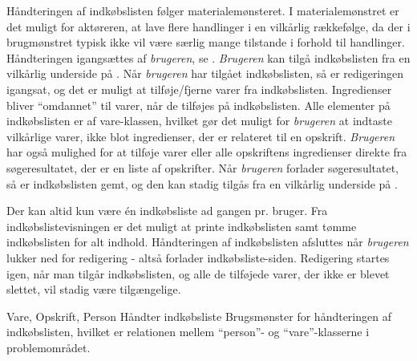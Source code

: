 {Håndteringen af indkøbslisten følger materialemønsteret\cite[p.~128]{ooad}. I materialemønstret er det muligt for aktøreren, at lave flere handlinger i en vilkårlig rækkefølge, da der i brugmønstret typisk ikke vil være særlig mange tilstande i forhold til handlinger. Håndteringen igangsættes af \textit{brugeren}, se . \textit{Brugeren} kan tilgå indkøbslisten fra en vilkårlig underside på \Foodl. Når \textit{brugeren} har tilgået indkøbslisten, så er redigeringen igangsat, og det er muligt at tilføje/fjerne varer fra indkøbslisten. Ingredienser bliver ``omdannet'' til varer, når de tilføjes på indkøbslisten. Alle elementer på indkøbslisten er af vare-klassen, hvilket gør det muligt for \textit{brugeren} at indtaste vilkårlige varer, ikke blot ingredienser, der er relateret til \fx en opskrift. \textit{Brugeren} har også mulighed for at tilføje varer eller alle opskriftens ingredienser direkte fra søgeresultatet, der er en liste af opskrifter. Når \textit{brugeren} forlader søgeresultatet, så er indkøbslisten gemt, og den kan stadig tilgås fra en vilkårlig underside på \Foodl. 

Der kan altid kun være én indkøbsliste ad gangen pr. bruger. Fra indkøbslistevisningen er det muligt at printe indkøbslisten samt tømme indkøbslisten for alt indhold. Håndteringen af indkøbslisten afsluttes når \textit{brugeren} lukker ned for redigering - altså forlader indkøbsliste-siden. Redigering startes igen, når man tilgår indkøbslisten, og alle de tilføjede varer, der ikke er blevet slettet, vil stadig være tilgængelige.}
{Vare, Opskrift, Person}
{Håndter indkøbsliste}
{Brugsmønster for håndteringen af indkøbslisten, hvilket er relationen mellem ``person''- og ``vare''-klasserne i problemområdet.}
